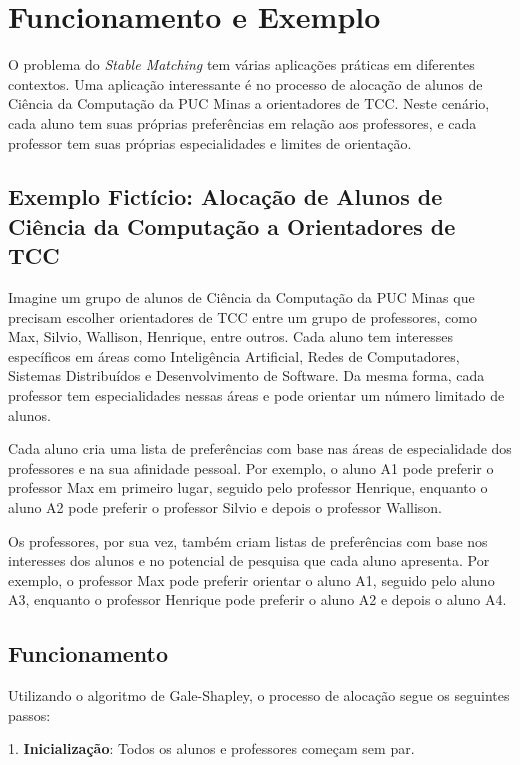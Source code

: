 \documentclass[12pt]{article}
\begin{document}
\section{Funcionamento e Exemplo}

O problema do \textit{Stable Matching} tem várias aplicações práticas em diferentes contextos. Uma aplicação interessante é no processo de alocação de alunos de Ciência da Computação da PUC Minas a orientadores de TCC. Neste cenário, cada aluno tem suas próprias preferências em relação aos professores, e cada professor tem suas próprias especialidades e limites de orientação.



\subsection{ Exemplo Fictício: Alocação de Alunos de Ciência da Computação a Orientadores de TCC}

Imagine um grupo de alunos de Ciência da Computação da PUC Minas que precisam escolher orientadores de TCC entre um grupo de professores, como Max, Silvio, Wallison, Henrique, entre outros. Cada aluno tem interesses específicos em áreas como Inteligência Artificial, Redes de Computadores, Sistemas Distribuídos e Desenvolvimento de Software. Da mesma forma, cada professor tem especialidades nessas áreas e pode orientar um número limitado de alunos.


Cada aluno cria uma lista de preferências com base nas áreas de especialidade dos professores e na sua afinidade pessoal. Por exemplo, o aluno A1 pode preferir o professor Max em primeiro lugar, seguido pelo professor Henrique, enquanto o aluno A2 pode preferir o professor Silvio e depois o professor Wallison.

Os professores, por sua vez, também criam listas de preferências com base nos interesses dos alunos e no potencial de pesquisa que cada aluno apresenta. Por exemplo, o professor Max pode preferir orientar o aluno A1, seguido pelo aluno A3, enquanto o professor Henrique pode preferir o aluno A2 e depois o aluno A4.

\subsection{Funcionamento}

Utilizando o algoritmo de Gale-Shapley, o processo de alocação segue os seguintes passos:

1. \textbf{Inicialização}: Todos os alunos e professores começam sem par.
\end{document}
